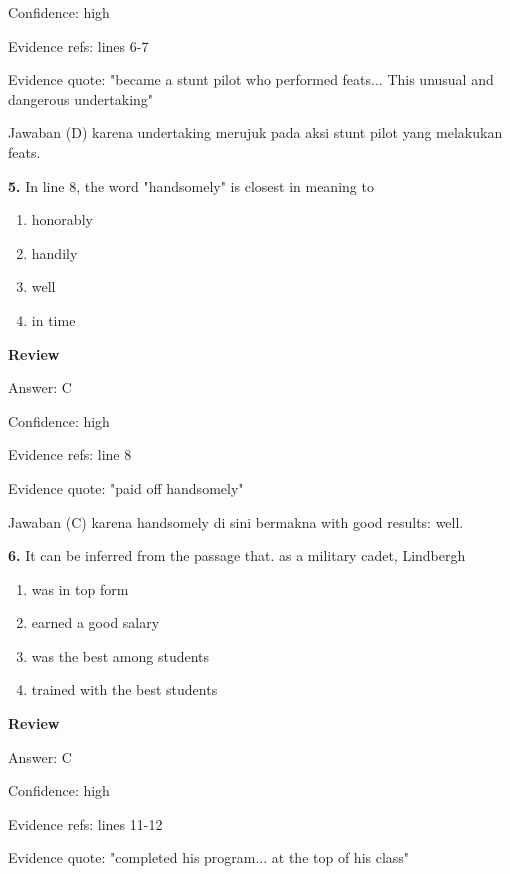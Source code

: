 \documentclass[12pt]{article}
\begin{document}
Confidence: high\par
Evidence refs: lines 6-7\par
Evidence quote: "became a stunt pilot who performed feats... This unusual and dangerous undertaking"\par
Jawaban (D) karena undertaking merujuk pada aksi stunt pilot yang melakukan feats.\par
\endgroup
\par
\vspace{0.25\baselineskip}
\noindent\textbf{5.} In line 8, the word "handsomely" is closest in meaning to
\begin{enumerate}[label=(\Alph*),leftmargin=*,itemsep=0.2em]
\item honorably
\item handily
\item well
\item in time
\end{enumerate}
\par
\begingroup
\setlength{\parskip}{0pt}
\setlength{\parindent}{0pt}
\textbf{Review}\par
Answer: C\par
Confidence: high\par
Evidence refs: line 8\par
Evidence quote: "paid off handsomely"\par
Jawaban (C) karena handsomely di sini bermakna with good results: well.\par
\endgroup
\par
\vspace{0.25\baselineskip}
\noindent\textbf{6.} It can be inferred from the passage that. as a military cadet, Lindbergh
\begin{enumerate}[label=(\Alph*),leftmargin=*,itemsep=0.2em]
\item was in top form
\item earned a good salary
\item was the best among students
\item trained with the best students
\end{enumerate}
\par
\begingroup
\setlength{\parskip}{0pt}
\setlength{\parindent}{0pt}
\textbf{Review}\par
Answer: C\par
Confidence: high\par
Evidence refs: lines 11-12\par
Evidence quote: "completed his program... at the top of his class"\par
\end{document}
